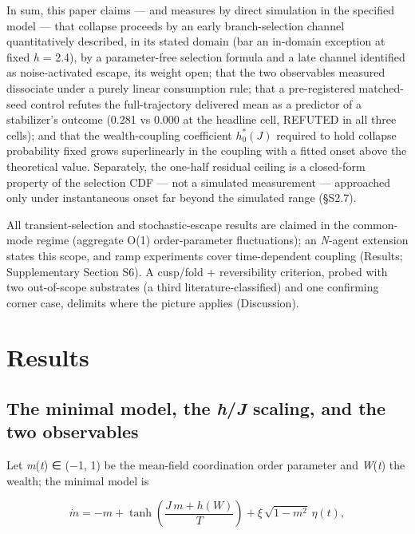 \documentclass[11pt,letterpaper]{article}
\begin{document}
In sum, this paper claims --- and measures by direct simulation in the specified model --- that collapse proceeds by an early branch-selection channel quantitatively described, in its stated domain (bar an in-domain exception at fixed \emph{h} = 2.4), by a parameter-free selection formula and a late channel identified as noise-activated escape, its weight open; that the two observables measured dissociate under a purely linear consumption rule; that a pre-registered matched-seed control refutes the full-trajectory delivered mean as a predictor of a stabilizer's outcome (0.281 vs 0.000 at the headline cell, REFUTED in all three cells); and that the wealth-coupling coefficient \(h_0^*(J)\) required to hold collapse probability fixed grows superlinearly in the coupling with a fitted onset above the theoretical value. Separately, the one-half residual ceiling is a closed-form property of the selection CDF --- not a simulated measurement --- approached only under instantaneous onset far beyond the simulated range (§S2.7).

All transient-selection and stochastic-escape results are claimed in the common-mode regime (aggregate O(1) order-parameter fluctuations); an \emph{N}-agent extension states this scope, and ramp experiments cover time-dependent coupling (Results; Supplementary Section S6). A cusp/fold + reversibility criterion, probed with two out-of-scope substrates (a third literature-classified) and one confirming corner case, delimits where the picture applies (Discussion).

\section{Results}\label{results}

\subsection{\texorpdfstring{The minimal model, the \emph{h}/\emph{J} scaling, and the two observables}{The minimal model, the h/J scaling, and the two observables}}\label{the-minimal-model-the-hj-scaling-and-the-two-observables}

Let \emph{m}(\emph{t}) ∈ (−1, 1) be the mean-field coordination order parameter and \emph{W}(\emph{t}) the wealth; the minimal model is


\begin{equation*}
\dot m = -m + \tanh\!\left(\frac{J\,m + h(W)}{T}\right) + \xi\,\sqrt{1-m^2}\,\eta(t), \tag{1}
\end{equation*}
\end{document}
